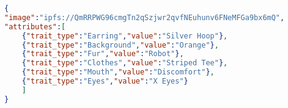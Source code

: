 \begin{lstlisting}[language=json,firstnumber=1, basicstyle=\tiny]
{
"image":"ipfs://QmRRPWG96cmgTn2qSzjwr2qvfNEuhunv6FNeMFGa9bx6mQ",
"attributes":[
	{"trait_type":"Earring","value":"Silver Hoop"},
	{"trait_type":"Background","value":"Orange"},
	{"trait_type":"Fur","value":"Robot"},
	{"trait_type":"Clothes","value":"Striped Tee"},
	{"trait_type":"Mouth","value":"Discomfort"},
	{"trait_type":"Eyes","value":"X Eyes"}
	]
}
\end{lstlisting}
